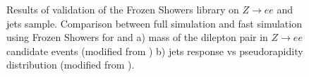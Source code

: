 \begin{figure}[!tbp]
\begin{minipage}[h]{0.49\linewidth}
\end{minipage}
\hfill
\begin{minipage}[h]{0.49\linewidth}
\end{minipage}
\caption{ Results of validation of the Frozen Showers library on $Z \to ee$ and jets sample. Comparison between full simulation and fast simulation using Frozen Showers for and a) mass of the dilepton pair in $Z \to ee$ candidate events (modified from \cite{ZeeVal}) b) jets response vs  pseudorapidity  distribution (modified from \cite{JetsVal}). }
\label{fig:OtherVal}
\end{figure}
